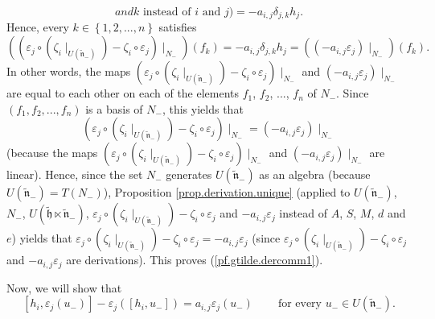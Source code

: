\documentclass[etingof-lie.tex]{subfiles}
\begin{document}
\begin{verlong}
\[{{{and }k\text{ instead of }i\text{ and }j\text{)}}}=-a_{i,j}\delta_{j,k}h_{j}.
\]
Hence, every $k\in\left\{  1,2,...,n\right\}  $ satisfies%
\[
\left(  \left(  \varepsilon_{j}\circ\left(  \zeta_{i}\mid_{U\left(
\widetilde{\mathfrak{n}}_{-}\right)  }\right)  -\zeta_{i}\circ\varepsilon
_{j}\right)  \mid_{N_{-}}\right)  \left(  f_{k}\right)  =-a_{i,j}\delta
_{j,k}h_{j}=\left(  \left(  -a_{i,j}\varepsilon_{j}\right)  \mid_{N_{-}%
}\right)  \left(  f_{k}\right)  .
\]
In other words, the maps $\left(  \varepsilon_{j}\circ\left(  \zeta_{i}%
\mid_{U\left(  \widetilde{\mathfrak{n}}_{-}\right)  }\right)  -\zeta_{i}%
\circ\varepsilon_{j}\right)  \mid_{N_{-}}$ and $\left(  -a_{i,j}%
\varepsilon_{j}\right)  \mid_{N_{-}}$ are equal to each other on each of the
elements $f_{1}$, $f_{2}$, $...$, $f_{n}$ of $N_{-}$. Since $\left(
f_{1},f_{2},...,f_{n}\right)  $ is a basis of $N_{-}$, this yields that
\[
\left(  \varepsilon_{j}\circ\left(  \zeta_{i}\mid_{U\left(
\widetilde{\mathfrak{n}}_{-}\right)  }\right)  -\zeta_{i}\circ\varepsilon
_{j}\right)  \mid_{N_{-}}=\left(  -a_{i,j}\varepsilon_{j}\right)  \mid_{N_{-}}%
\]
(because the maps $\left(  \varepsilon_{j}\circ\left(  \zeta_{i}\mid_{U\left(
\widetilde{\mathfrak{n}}_{-}\right)  }\right)  -\zeta_{i}\circ\varepsilon
_{j}\right)  \mid_{N_{-}}$ and $\left(  -a_{i,j}\varepsilon_{j}\right)
\mid_{N_{-}}$ are linear). Hence, since the set $N_{-}$ generates $U\left(
\widetilde{\mathfrak{n}}_{-}\right)  $ as an algebra (because $U\left(
\widetilde{\mathfrak{n}}_{-}\right)  =T\left(  N_{-}\right)  $), Proposition
\ref{prop.derivation.unique} (applied to $U\left(  \widetilde{\mathfrak{n}%
}_{-}\right)  $, $N_{-}$, $U\left(  \widetilde{\mathfrak{h}}\ltimes
\widetilde{\mathfrak{n}}_{-}\right)  $, $\varepsilon_{j}\circ\left(  \zeta
_{i}\mid_{U\left(  \widetilde{\mathfrak{n}}_{-}\right)  }\right)  -\zeta
_{i}\circ\varepsilon_{j}$ and $-a_{i,j}\varepsilon_{j}$ instead of $A$, $S$,
$M$, $d$ and $e$) yields that $\varepsilon_{j}\circ\left(  \zeta_{i}%
\mid_{U\left(  \widetilde{\mathfrak{n}}_{-}\right)  }\right)  -\zeta_{i}%
\circ\varepsilon_{j}=-a_{i,j}\varepsilon_{j}$ (since $\varepsilon_{j}%
\circ\left(  \zeta_{i}\mid_{U\left(  \widetilde{\mathfrak{n}}_{-}\right)
}\right)  -\zeta_{i}\circ\varepsilon_{j}$ and $-a_{i,j}\varepsilon_{j}$ are
derivations). This proves (\ref{pf.gtilde.dercomm1}).
\end{verlong}

Now, we will show that
\begin{equation}
\left[  h_{i},\varepsilon_{j}\left(  u_{-}\right)  \right]  -\varepsilon
_{j}\left(  \left[  h_{i},u_{-}\right]  \right)  =a_{i,j}\varepsilon
_{j}\left(  u_{-}\right)  \ \ \ \ \ \ \ \ \ \ \text{for every }u_{-}\in
U\left(  \widetilde{\mathfrak{n}}_{-}\right)  . \label{pf.gtilde.dercomm2}%
\end{equation}
\end{document}
